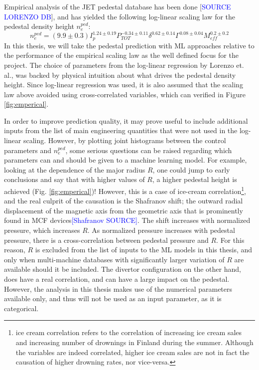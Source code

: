 \documentclass[a4paper, twoside, final, 12pt]{article}
\begin{document}
Empirical analysis of the JET pedestal database has been done [\textcolor{blue}{SOURCE LORENZO DB}], and has yielded the following log-linear scaling law for the pedestal density height $n_e^{ped}$:
\begin{equation} \label{eq:scaling}
	n_e^{ped} = (9.9 \pm 0.3) I_p^{1.24 \pm 0.19} P_{TOT}^{-0.34 \pm 0.11} \delta^{0.62 \pm 0.14} \Gamma^{ 0.08 \pm 0.04} M_{eff}^{0.2 \pm 0.2}
\end{equation}
In this thesis, we will take the pedestal prediction with ML approaches relative to the performance of the empirical scaling law as the well defined focus for the project.
The choice of parameters from the log-linear regression by Lorenzo et. al., was backed by physical intuition about what drives the pedestal density height. Since log-linear regression was used, it is also assumed that the scaling law above avoided using cross-correlated variables, which can verified in Figure \ref{fig:emperical}. 

In order to improve prediction quality, it may prove useful to include additional inputs from the list of main engineering quantities that were not used in the log-linear scaling.
However, by plotting joint histograms between the control parameters and $n_e^{ped}$, some serious questions can be raised regarding which parameters can and should be given to a machine learning model.
For example, looking at the dependence of the major radius $R$, one could jump to early conclusions and say that with higher values of $R$, a higher pedestal height is achieved (Fig. \ref{fig:emperical})!
However, this is a case of ice-cream correlation\footnote{ice cream correlation refers to the correlation of increasing ice cream sales and increasing number of drownings in Finland during the summer. Although the variables are indeed correlated, higher ice cream sales are not in fact the causation of higher drowning rates, nor vice-versa.}, and the real culprit of the causation is the Shafranov shift; the outward radial displacement of the magnetic axis from the geometric axis that is prominently found in MCF devices\textcolor{blue}{[Shafranov SOURCE]}. The shift increases with normalized pressure, which increases $R$. As normalized pressure increases with pedestal pressure, there is a cross-correlation between pedestal pressure and $R$. For this reason, $R$ is excluded from the list of inputs to the ML models in this thesis, and only when multi-machine databases with significantly larger variation of $R$ are available should it be included.
The divertor configuration on the other hand, does have a real correlation, and can have a large impact on the pedestal. However, the analysis in this thesis makes use of the numerical parameters available only, and thus will not be used as an input parameter, as it is categorical.  
\end{document}
